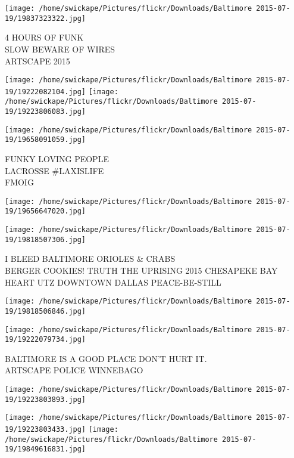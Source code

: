\documentclass[10pt,letterpaper]{article}
\begin{document}
\vspace{0.25in}
\texttt{[image: /home/swickape/Pictures/flickr/Downloads/Baltimore 2015-07-19/19837323322.jpg]}

4 HOURS OF FUNK\\
SLOW BEWARE OF WIRES\\
ARTSCAPE 2015
\pagebreak

\texttt{[image: /home/swickape/Pictures/flickr/Downloads/Baltimore 2015-07-19/19222082104.jpg]}
\texttt{[image: /home/swickape/Pictures/flickr/Downloads/Baltimore 2015-07-19/19223806083.jpg]}

\vspace{0.25in}
\texttt{[image: /home/swickape/Pictures/flickr/Downloads/Baltimore 2015-07-19/19658091059.jpg]}

FUNKY LOVING PEOPLE\\
LACROSSE \#LAXISLIFE\\
FMOIG
\pagebreak

\texttt{[image: /home/swickape/Pictures/flickr/Downloads/Baltimore 2015-07-19/19656647020.jpg]}

\vspace{0.25in}
\texttt{[image: /home/swickape/Pictures/flickr/Downloads/Baltimore 2015-07-19/19818507306.jpg]}

I BLEED BALTIMORE ORIOLES \& CRABS\\
BERGER COOKIES!  TRUTH THE UPRISING 2015 CHESAPEKE BAY HEART UTZ DOWNTOWN DALLAS PEACE{-}BE{-}STILL
\pagebreak

\texttt{[image: /home/swickape/Pictures/flickr/Downloads/Baltimore 2015-07-19/19818506846.jpg]}

\vspace{0.25in}
\texttt{[image: /home/swickape/Pictures/flickr/Downloads/Baltimore 2015-07-19/19222079734.jpg]}

BALTIMORE IS A GOOD PLACE DON'T HURT IT.\\
ARTSCAPE POLICE WINNEBAGO
\pagebreak

\texttt{[image: /home/swickape/Pictures/flickr/Downloads/Baltimore 2015-07-19/19223803893.jpg]}

\vspace{0.25in}
\texttt{[image: /home/swickape/Pictures/flickr/Downloads/Baltimore 2015-07-19/19223803433.jpg]}
\texttt{[image: /home/swickape/Pictures/flickr/Downloads/Baltimore 2015-07-19/19849616831.jpg]}
\end{document}
